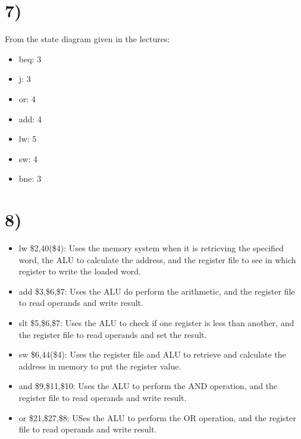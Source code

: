 \documentclass[a4paper,11pt]{article}
\begin{document}

\section*{7)}
From the state diagram given in the lectures:\\

\begin{itemize}
  \item beq: 3
  \item j: 3
  \item or: 4
  \item add: 4 
  \item lw: 5
  \item sw: 4
  \item bne: 3
\end{itemize}



\section*{8)}
\begin{itemize}
  \item lw \$2,40(\$4):  Uses the memory system when it is retrieving the specified word, the ALU to calculate the address, and the register file to see in which register to write the loaded word.
  \item add \$3,\$6,\$7: Uses the ALU do perform the arithmetic, and the register file to read operands and write result.
  \item slt \$5,\$6,\$7:  Uses the ALU to check if one register is less than another, and the register file to read operands and set the result.
  \item sw \$6,44(\$4):  Uses the register file and ALU to retrieve and calculate the address in memory to put the register value.
  \item and \$9,\$11,\$10:  Uses the ALU to perform the AND operation, and the register file to read operands and write result.
  \item or \$21,\$27,\$8: USes the ALU to perform the OR operation, and the register file to read operands and write result.
\end{itemize}

\end{document}
